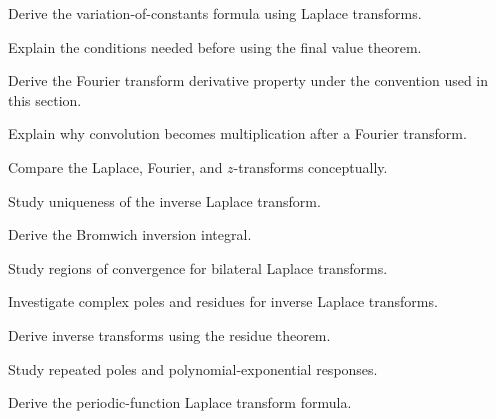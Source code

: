 \begin{exercise}[3]
Derive the variation-of-constants formula using Laplace transforms.
\end{exercise}

\begin{exercise}[3]
Explain the conditions needed before using the final value theorem.
\end{exercise}

\begin{exercise}[3]
Derive the Fourier transform derivative property under the convention
used in this section.
\end{exercise}

\begin{exercise}[3]
Explain why convolution becomes multiplication after a Fourier transform.
\end{exercise}

\begin{exercise}[3]
Compare the Laplace, Fourier, and \(z\)-transforms conceptually.
\end{exercise}

\begin{exercise}[4]
Study uniqueness of the inverse Laplace transform.
\end{exercise}

\begin{exercise}[4]
Derive the Bromwich inversion integral.
\end{exercise}

\begin{exercise}[4]
Study regions of convergence for bilateral Laplace transforms.
\end{exercise}

\begin{exercise}[4]
Investigate complex poles and residues for inverse Laplace transforms.
\end{exercise}

\begin{exercise}[4]
Derive inverse transforms using the residue theorem.
\end{exercise}

\begin{exercise}[4]
Study repeated poles and polynomial-exponential responses.
\end{exercise}

\begin{exercise}[4]
Derive the periodic-function Laplace transform formula.
\end{exercise}

